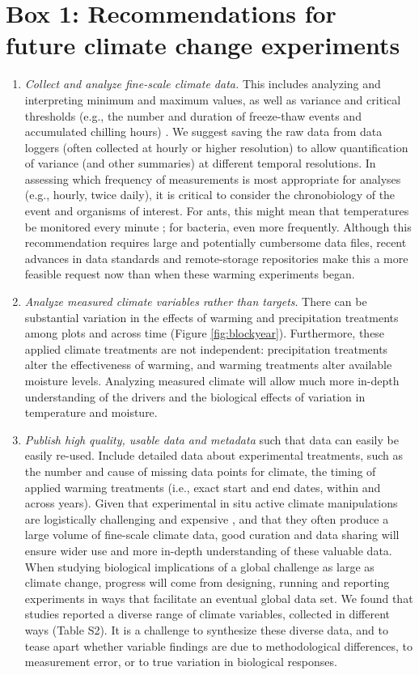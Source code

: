 \documentclass{article}
\begin{document}
\section* {Box 1: Recommendations for future climate change experiments} 
\begin{enumerate}
\item\textit{Collect and analyze fine-scale climate data.} This includes analyzing and interpreting minimum and maximum values, as well as variance and critical thresholds (e.g., the number and duration of freeze-thaw events and accumulated chilling hours) \citep{mcdaniel2014,vasseur2014}. We suggest saving the raw data from data loggers (often collected at hourly or higher resolution) to allow quantification of variance (and other summaries) at different temporal resolutions. In assessing which frequency of measurements is most appropriate for analyses (e.g., hourly, twice daily), it is critical to consider the chronobiology of the event and organisms of interest. For ants, this might mean that temperatures be monitored every minute \citep{shavit2017}; for bacteria, even more frequently. Although this recommendation requires large and potentially cumbersome data files, recent advances in data standards and remote-storage repositories make this a more feasible request now than when these warming experiments began.
\item\textit{Analyze measured climate variables rather than targets}. There can be substantial variation in the effects of warming and precipitation treatments among plots and across time (Figure \ref{fig:blockyear}). Furthermore, these applied climate treatments are not independent: precipitation treatments alter the effectiveness of warming, and warming treatments alter available moisture levels. Analyzing measured climate will allow much more in-depth understanding of the drivers and the biological effects of variation in temperature and moisture. 
\item\textit{Publish high quality, usable data and metadata} such that data can easily be easily re-used. Include detailed data about experimental treatments, such as the number and cause of missing data points for climate, the timing of applied warming treatments (i.e., exact start and end dates, within and across years). Given that experimental in situ active climate manipulations are logistically challenging and expensive \citep{aronson2009}, and that they often produce a large volume of fine-scale climate data, good curation and data sharing will ensure wider use and more in-depth understanding of these valuable data. When studying biological implications of a global challenge as large as climate change, progress will come from designing, running and reporting experiments in ways that facilitate an eventual global data set. We found that studies reported a diverse range of climate variables, collected in different ways (Table S2). It is a challenge to synthesize these diverse data, and to tease apart whether variable findings are due to methodological differences, to measurement error, or to true variation in biological responses. %

\end{enumerate}
\end{document}
